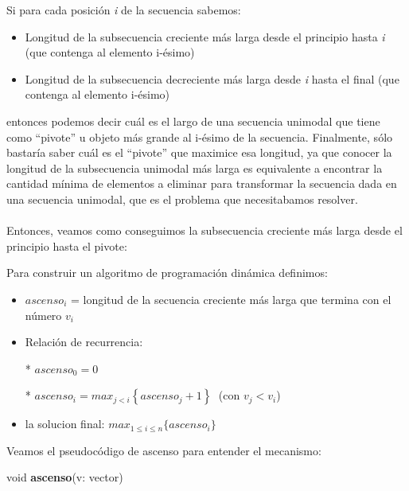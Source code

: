 Si para cada posición \textit{i} de la secuencia sabemos:
\begin{itemize}
	\item Longitud de la subsecuencia creciente más larga desde el principio hasta \textit{i} (que contenga al elemento i-ésimo)
	\item Longitud de la subsecuencia decreciente más larga desde \textit{i} hasta el final (que contenga al elemento i-ésimo)
\end{itemize}

entonces podemos decir cuál es el largo de una secuencia unimodal que tiene como ``pivote'' u objeto más grande al i-ésimo de la secuencia. Finalmente, sólo bastaría saber cuál es el ``pivote'' que maximice esa longitud, ya que conocer la longitud de la subsecuencia unimodal más larga es equivalente a encontrar la cantidad mínima de elementos a eliminar para transformar la secuencia dada en una secuencia unimodal, que es el problema que necesitabamos resolver.

\paragraph{}
Entonces, veamos como conseguimos la subsecuencia creciente más larga desde el principio hasta el pivote:


Para construir un algoritmo de programación dinámica definimos:
\begin{itemize}
	
\item $ascenso_i$ = longitud de la secuencia creciente más larga que termina con el número $v_i$
	
\item Relación de recurrencia:	 
  
  * $ascenso_0 = 0$

  * $ascenso_i  = max_{j<i} \left\lbrace ascenso_j + 1\right\rbrace  \;      $ (con $ v_j < v_i  $)

	
\item la solucion final: $max_{1\leq i\leq n} \{ascenso_i\}$
\end{itemize}
 \vspace*{0.5cm}
Veamos el pseudocódigo de ascenso para entender el mecanismo:
\vspace*{1cm}

void  \textbf{ascenso}(v: vector)\\
	\begin{algorithm}[H]

  \end{algorithm}

